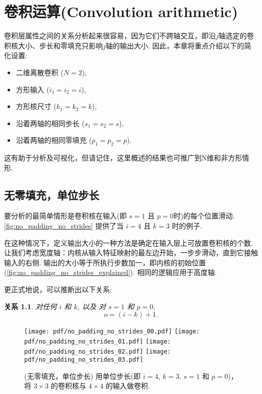 \documentclass[notitlepage]{ctexrep}
\newtheorem{relationship}{关系}
\begin{document}
\chapter{卷积运算(Convolution arithmetic)}

卷积层属性之间的关系分析起来很容易，因为它们不跨轴交互，即沿$j$轴选定的卷积核大小、步长和零填充只影响$j$轴的输出大小. 因此，本章将重点介绍以下的简化设置:

\begin{itemize}
    \item 二维离散卷积 ($N = 2$),
    \item 方形输入 ($i_1 = i_2 = i$),
    \item 方形核尺寸 ($k_1 = k_2 = k$),
    \item 沿着两轴的相同步长 ($s_1 = s_2 = s$),
    \item 沿着两轴的相同零填充 ($p_1 = p_2 = p$).
\end{itemize}

这有助于分析及可视化，但请记住，这里概述的结果也可推广到N维和非方形情形.

\section{无零填充，单位步长}

要分析的最简单情形是卷积核在输入(即 $s = 1$ 且 $p = 0$时)的每个位置滑动.
\autoref{fig:no_padding_no_strides} 提供了当 $i = 4$ 且 $k =
3$ 时的例子.

在这种情况下，定义输出大小的一种方法是确定在输入层上可放置卷积核的个数. 让我们考虑宽度轴：内核从输入特征映射的最左边开始，一步步滑动，直到它接触输入的右侧. 输出的大小等于所执行步数加一，即内核的初始位置 (\autoref{fig:no_padding_no_strides_explained}). 相同的逻辑应用于高度轴.

更正式地说，可以推断出以下关系:

\begin{relationship}\label{rel:no_padding_no_strides}
对任何 $i$ 和 $k$, 以及 对 $s = 1$ 和 $p = 0$,
\begin{equation*}
    o = (i - k) + 1.
\end{equation*}
\end{relationship}

\begin{figure}[p]
    \centering
    \texttt{[image: pdf/no\_padding\_no\_strides\_00.pdf]}
    \texttt{[image: pdf/no\_padding\_no\_strides\_01.pdf]}
    \texttt{[image: pdf/no\_padding\_no\_strides\_02.pdf]}
    \texttt{[image: pdf/no\_padding\_no\_strides\_03.pdf]}
    \caption{\label{fig:no_padding_no_strides} (无零填充，单位步长)
    用单位步长(即 $i = 4$, $k = 3$, $s = 1$ 和 $p = 0$)，将 $3 \times 3$ 的卷积核与 $4 \times 4$ 的输入做卷积.}
\end{figure}
\end{document}
